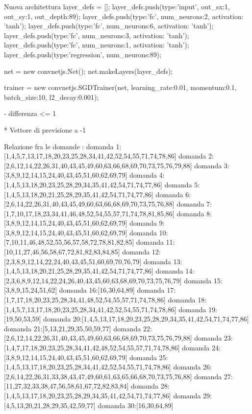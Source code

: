 Nuova architettura
layer_defs = [];
layer_defs.push({type:'input', out_sx:1, out_sy:1, out_depth:89});
layer_defs.push({type:'fc', num_neurons:2, activation: 'tanh'});
layer_defs.push({type:'fc', num_neurons:6, activation: 'tanh'});
layer_defs.push({type:'fc', num_neurons:3, activation: 'tanh'});
layer_defs.push({type:'fc', num_neurons:1, activation: 'tanh'});
layer_defs.push({type:'regression', num_neurons:89});

net = new convnetjs.Net();
net.makeLayers(layer_defs);

trainer = new convnetjs.SGDTrainer(net, {learning_rate:0.01, momentum:0.1, batch_size:10, l2_decay:0.001});

- differenza <= 1

* Vettore di previsione a -1

Relazione fra le domande :
domanda 1:[1,4,5,7,13,17,18,20,23,25,28,34,41,42,52,54,55,71,74,78,86]
domanda 2:[2,6,12,14,22,26,31,40,43,45,49,60,63,66,68,69,70,73,75,76,79,88]
domanda 3:[3,8,9,12,14,15,24,40,43,45,51,60,62,69,79]
domanda 4:[1,4,5,13,18,20,23,25,28,29,34,35,41,42,54,71,74,77,86]
domanda 5:[1,4,5,13,18,20,21,25,28,29,35,41,42,54,71,74,77,86]
domanda 6:[2,6,14,22,26,31,40,43,45,49,60,63,66,68,69,70,73,75,76,88]
domanda 7:[1,7,10,17,18,23,34,41,46,48,52,54,55,57,71,74,78,81,85,86]
domanda 8:[3,8,9,12,14,15,24,40,43,45,51,60,62,69,79]
domanda 9:[3,8,9,12,14,15,24,40,43,45,51,60,62,69,79]
domanda 10:[7,10,11,46,48,52,55,56,57,58,72,78,81,82,85]
domanda 11:[10,11,27,46,56,58,67,72,81,82,83,84,85]
domanda 12:[2,3,8,9,12,14,22,24,40,43,45,51,60,69,70,76,79]
domanda 13:[1,4,5,13,18,20,21,25,28,29,35,41,42,54,71,74,77,86]
domanda 14:[2,3,6,8,9,12,14,22,24,26,40,43,45,60,63,68,69,70,73,75,76,79]
domanda 15:[3,8,9,15,24,51,62]
domanda 16:[16,30,64,89]
domanda 17:[1,7,17,18,20,23,25,28,34,41,48,52,54,55,57,71,74,78,86]
domanda 18:[1,4,5,7,13,17,18,20,23,25,28,34,41,42,52,54,55,71,74,78,86]
domanda 19:[19,50,53,59]
domanda 20:[1,4,5,13,17,18,20,23,25,28,29,34,35,41,42,54,71,74,77,86]
domanda 21:[5,13,21,29,35,50,59,77]
domanda 22:[2,6,12,14,22,26,31,40,43,45,49,60,63,66,68,69,70,73,75,76,79,88]
domanda 23:[1,4,7,17,18,20,23,25,28,34,41,42,48,52,54,55,57,71,74,78,86]
domanda 24:[3,8,9,12,14,15,24,40,43,45,51,60,62,69,79]
domanda 25:[1,4,5,13,17,18,20,23,25,28,34,41,42,52,54,55,71,74,78,86]
domanda 26:[2,6,14,22,26,31,33,38,43,47,49,60,61,63,65,66,68,70,73,75,76,88]
domanda 27:[11,27,32,33,38,47,56,58,61,67,72,82,83,84]
domanda 28:[1,4,5,13,17,18,20,23,25,28,29,34,35,41,42,54,71,74,77,86]
domanda 29:[4,5,13,20,21,28,29,35,42,59,77]
domanda 30:[16,30,64,89]
